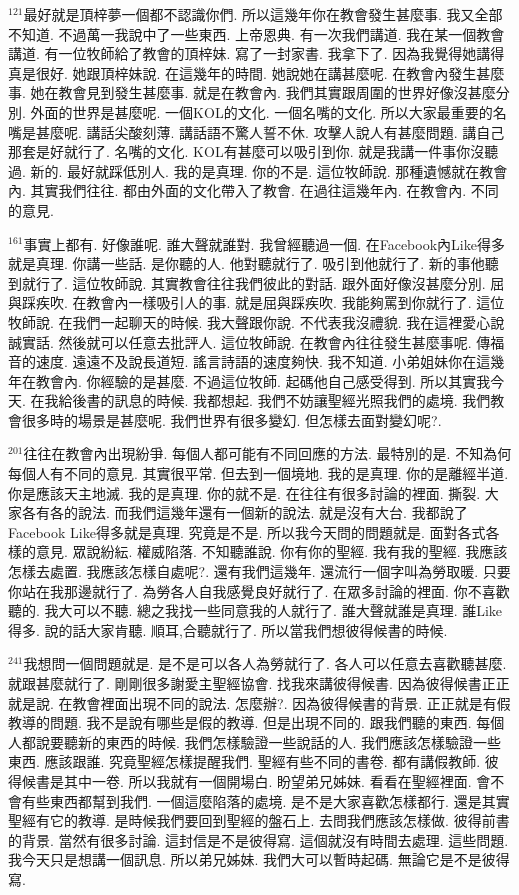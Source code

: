 \documentclass{book}
\begin{document}
$^{121}$最好就是頂梓夢一個都不認識你們.
所以這幾年你在教會發生甚麼事.
我又全部不知道.
不過萬一我說中了一些東西.
上帝恩典.
有一次我們講道.
我在某一個教會講道.
有一位牧師給了教會的頂梓妹.
寫了一封家書.
我拿下了.
因為我覺得她講得真是很好.
她跟頂梓妹說.
在這幾年的時間.
她說她在講甚麼呢.
在教會內發生甚麼事.
她在教會見到發生甚麼事.
就是在教會內.
我們其實跟周圍的世界好像沒甚麼分別.
外面的世界是甚麼呢.
一個KOL的文化.
一個名嘴的文化.
所以大家最重要的名嘴是甚麼呢.
講話尖酸刻薄.
講話語不驚人誓不休.
攻擊人說人有甚麼問題.
講自己那套是好就行了.
名嘴的文化.
KOL有甚麼可以吸引到你.
就是我講一件事你沒聽過.
新的.
最好就踩低別人.
我的是真理.
你的不是.
這位牧師說.
那種遺憾就在教會內.
其實我們往往.
都由外面的文化帶入了教會.
在過往這幾年內.
在教會內.
不同的意見.

$^{161}$事實上都有.
好像誰呢.
誰大聲就誰對.
我曾經聽過一個.
在Facebook內Like得多就是真理.
你講一些話.
是你聽的人.
他對聽就行了.
吸引到他就行了.
新的事他聽到就行了.
這位牧師說.
其實教會往往我們彼此的對話.
跟外面好像沒甚麼分別.
屈與踩疾吹.
在教會內一樣吸引人的事.
就是屈與踩疾吹.
我能夠罵到你就行了.
這位牧師說.
在我們一起聊天的時候.
我大聲跟你說.
不代表我沒禮貌.
我在這裡愛心說誠實話.
然後就可以任意去批評人.
這位牧師說.
在教會內往往發生甚麼事呢.
傳福音的速度.
遠遠不及說長道短.
謠言詩語的速度夠快.
我不知道.
小弟姐妹你在這幾年在教會內.
你經驗的是甚麼.
不過這位牧師.
起碼他自己感受得到.
所以其實我今天.
在我給後書的訊息的時候.
我都想起.
我們不妨讓聖經光照我們的處境.
我們教會很多時的場景是甚麼呢.
我們世界有很多變幻.
但怎樣去面對變幻呢?.

$^{201}$往往在教會內出現紛爭.
每個人都可能有不同回應的方法.
最特別的是.
不知為何每個人有不同的意見.
其實很平常.
但去到一個境地.
我的是真理.
你的是離經半道.
你是應該天主地滅.
我的是真理.
你的就不是.
在往往有很多討論的裡面.
撕裂.
大家各有各的說法.
而我們這幾年還有一個新的說法.
就是沒有大台.
我都說了Facebook Like得多就是真理.
究竟是不是.
所以我今天問的問題就是.
面對各式各樣的意見.
眾說紛紜.
權威陷落.
不知聽誰說.
你有你的聖經.
我有我的聖經.
我應該怎樣去處置.
我應該怎樣自處呢?.
還有我們這幾年.
還流行一個字叫為勞取暖.
只要你站在我那邊就行了.
為勞各人自我感覺良好就行了.
在眾多討論的裡面.
你不喜歡聽的.
我大可以不聽.
總之我找一些同意我的人就行了.
誰大聲就誰是真理.
誰Like得多.
說的話大家肯聽.
順耳,合聽就行了.
所以當我們想彼得候書的時候.

$^{241}$我想問一個問題就是.
是不是可以各人為勞就行了.
各人可以任意去喜歡聽甚麼.
就跟甚麼就行了.
剛剛很多謝愛主聖經協會.
找我來講彼得候書.
因為彼得候書正正就是說.
在教會裡面出現不同的說法.
怎麼辦?.
因為彼得候書的背景.
正正就是有假教導的問題.
我不是說有哪些是假的教導.
但是出現不同的.
跟我們聽的東西.
每個人都說要聽新的東西的時候.
我們怎樣驗證一些說話的人.
我們應該怎樣驗證一些東西.
應該跟誰.
究竟聖經怎樣提醒我們.
聖經有些不同的書卷.
都有講假教師.
彼得候書是其中一卷.
所以我就有一個開場白.
盼望弟兄姊妹.
看看在聖經裡面.
會不會有些東西都幫到我們.
一個這麼陷落的處境.
是不是大家喜歡怎樣都行.
還是其實聖經有它的教導.
是時候我們要回到聖經的盤石上.
去問我們應該怎樣做.
彼得前書的背景.
當然有很多討論.
這封信是不是彼得寫.
這個就沒有時間去處理.
這些問題.
我今天只是想講一個訊息.
所以弟兄姊妹.
我們大可以暫時起碼.
無論它是不是彼得寫.
\end{document}
